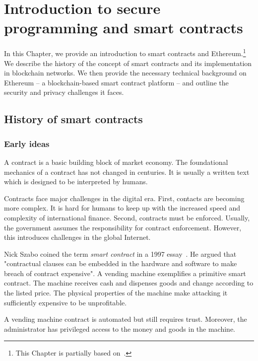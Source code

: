 \chapter{Introduction to secure programming and smart contracts}

\label{Chapter09Introcontracts}

In this Chapter, we provide an introduction to smart contracts and Ethereum.\footnote{This Chapter is partially based on~\cite{Tikhomirov2017}.}
We describe the history of the concept of smart contracts and its implementation in blockchain networks.
We then provide the necessary technical background on Ethereum -- a blockchain-based smart contract platform -- and outline the security and privacy challenges it faces.


\section{History of smart contracts}

\subsection{Early ideas}

A contract is a basic building block of market economy.
The foundational mechanics of a contract has not changed in centuries.
It is usually a written text which is designed to be interpreted by humans.

Contracts face major challenges in the digital era.
First, contacts are becoming more complex.
It is hard for humans to keep up with the increased speed and complexity of international finance.
Second, contracts must be enforced.
Usually, the government assumes the responsibility for contract enforcement.
However, this introduces challenges in the global Internet.

Nick Szabo coined the term \textit{smart contract} in a 1997 essay~\cite{Szabo1997}.
He argued that "contractual clauses \textelp{} can be embedded in the hardware and software \textelp{} to make breach of contract expensive".
A vending machine exemplifies a primitive smart contract.
The machine receives cash and dispenses goods and change according to the listed price.
The physical properties of the machine make attacking it sufficiently expensive to be unprofitable.

A vending machine contract is automated but still requires trust.
Moreover, the administrator has privileged access to the money and goods in the machine.



